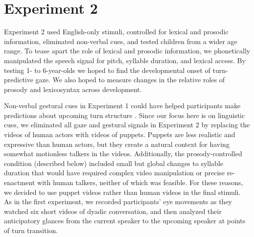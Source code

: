 \documentclass[authoryear, 12pt]{elsarticle}
\begin{document}

\section*{Experiment 2}
\label{sec:exp2}

Experiment 2 used English-only stimuli, controlled for lexical and prosodic information, eliminated non-verbal cues, and tested children from a wider age range. To tease apart the role of lexical and prosodic information, we phonetically manipulated the speech signal for pitch, syllable duration, and lexical access. By testing 1- to 6-year-olds we hoped to find the developmental onset of turn-predictive gaze. We also hoped to measure changes in the relative roles of prosody and lexicosyntax across development.

Non-verbal gestural cues in Experiment 1 could have helped participants make predictions about upcoming turn structure \citep{rossano2009, stivers2010}. Since our focus here is on linguistic cues, we eliminated all gaze and gestural signals in Experiment 2 by replacing the videos of human actors with videos of puppets. Puppets are less realistic and expressive than human actors, but they create a natural context for having somewhat motionless talkers in the videos. Additionally, the prosody-controlled condition (described below) included small but global changes to syllable duration that would have required complex video manipulation or precise re-enactment with human talkers, neither of which was feasible. For these reasons, we decided to use puppet videos rather than human videos in the final stimuli. As in the first experiment, we recorded participants' eye movements as they watched six short videos of dyadic conversation, and then analyzed their anticipatory glances from the current speaker to the upcoming speaker at points of turn transition.
\end{document}
